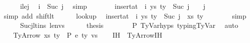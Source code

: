 \begin{isabellebody}
\isanewline
\ \ \ \ \isamarkupfalse%
\ i{\isacharunderscore}{\kern0pt}le{\isacharunderscore}{\kern0pt}j\ \isamarkupfalse%
\ {\isachardoublequoteopen}i\ {\isacharless}{\kern0pt}\ Suc\ j{\isachardoublequoteclose}\ \isamarkupfalse%
\ simp\isanewline
\ \ \ \ \isamarkupfalse%
\ \isamarkupfalse%
\ {\isachardoublequoteopen}{\isacharparenleft}{\kern0pt}insert{\isacharunderscore}{\kern0pt}at\ {\isasymGamma}\ i\ {\isacharparenleft}{\kern0pt}ys{\isacharcomma}{\kern0pt}\ ty{}{\isacharparenright}{\kern0pt}{\isacharparenright}{\kern0pt}\ {\isacharbang}{\kern0pt}\ Suc\ j\ {\isacharequal}{\kern0pt}\ {\isasymGamma}\ {\isacharbang}{\kern0pt}\ j{\isachardoublequoteclose}\isanewline
\ \ \ \ \ \ \isamarkupfalse%
\ {\isacharparenleft}{\kern0pt}simp\ add{\isacharcolon}{\kern0pt}\ shift{\isacharunderscore}{\kern0pt}lt{\isacharparenright}{\kern0pt}\isanewline
\isanewline
\ \ \ \ \isamarkupfalse%
\ lookup\ \isamarkupfalse%
\ {\isachardoublequoteopen}{\isacharparenleft}{\kern0pt}insert{\isacharunderscore}{\kern0pt}at\ {\isasymGamma}\ i\ {\isacharparenleft}{\kern0pt}ys{\isacharcomma}{\kern0pt}\ ty{}{\isacharparenright}{\kern0pt}{\isacharparenright}{\kern0pt}\ {\isacharbang}{\kern0pt}\ Suc\ j\ {\isacharequal}{\kern0pt}\ {\isacharparenleft}{\kern0pt}xs{\isacharcomma}{\kern0pt}\ ty{\isacharparenright}{\kern0pt}{\isachardoublequoteclose}\isanewline
\ \ \ \ \ \ \isamarkupfalse%
\ simp\isanewline
\isanewline
\ \ \ \ \isamarkupfalse%
\ Sucj{\isacharunderscore}{\kern0pt}lt{\isacharunderscore}{\kern0pt}ins\ len{\isacharunderscore}{\kern0pt}vs\isanewline
\ \ \ \ \isamarkupfalse%
\ {\isacharquery}{\kern0pt}thesis\isanewline
\ \ \ \ \ \ \isamarkupfalse%
\ P{}\ TyVar{\isachardot}{\kern0pt}hyps{\isacharparenleft}{\kern0pt}{}{\isacharcomma}{\kern0pt}{}{\isacharcomma}{\kern0pt}{}{\isacharparenright}{\kern0pt}\ typing{\isachardot}{\kern0pt}TyVar\ \isamarkupfalse%
\ auto\isanewline
\ \ \isamarkupfalse%
\isanewline
\isanewline
{}\isamarkupfalse%
\isanewline
\ \ \isamarkupfalse%
\ {\isacharparenleft}{\kern0pt}TyArrow\ xs\ ty{}\ {\isasymGamma}\ P\ e\ ty{}{\isacharprime}{\kern0pt}\ vs{\isacharparenright}{\kern0pt}\isanewline
\ \ \isamarkupfalse%
\ IH\ {\isacharequal}{\kern0pt}\ TyArrow{\isachardot}{\kern0pt}IH\isanewline

\end{isabellebody}

